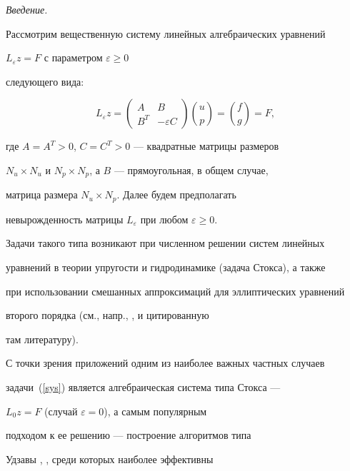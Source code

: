\label{begin}








{\it Введение.}


Рассмотрим вещественную систему линейных алгебраических уравнений


$L_{\varepsilon}z=F$ с параметром $\varepsilon\geq 0$


следующего вида:


\begin{equation}


\label{sys}


L_{\varepsilon} z=\begin{pmatrix}


A & B \\ B^T & - \varepsilon C \end{pmatrix}


\binom{u}{p}=\binom{f}{g}=F,


\end{equation}


где $A=A^T>0$, $C=C^T>0$ --- квадратные матрицы размеров


$N_u\times N_u$ и $N_p\times N_p$, а $B$ --- прямоугольная, в общем случае,


матрица размера $N_u\times N_p$. Далее будем предполагать


невырожденность матрицы $L_{\varepsilon}$ при любом $\varepsilon\geq 0$.


Задачи такого типа возникают при численном решении систем линейных


уравнений в теории упругости и гидродинамике (задача Стокса), а также


при использовании смешанных аппроксимаций для эллиптических уравнений


второго порядка (см., напр., \cite{Diak1}, \cite{BrFor} и цитированную


там литературу).





С точки зрения приложений одним из наиболее важных частных случаев


задачи~(\ref{sys}) является алгебраическая система типа Стокса ---


$L_{0}z=F$ (случай $\varepsilon = 0$), а самым популярным


подходом к ее решению --- построение алгоритмов типа


Удзавы \cite{AGU}, \cite{L-Q1}, среди которых наиболее эффективны


